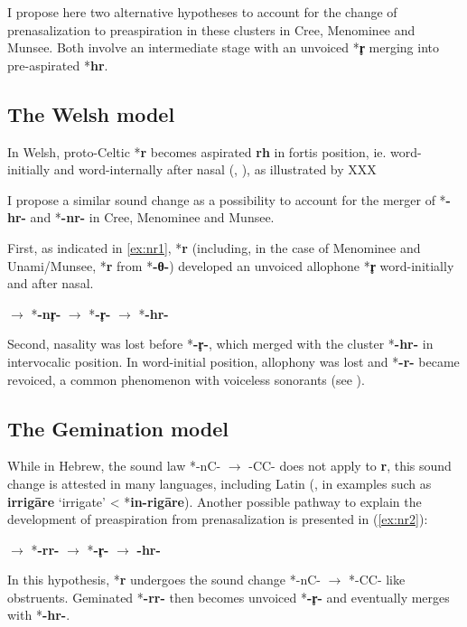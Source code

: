 \documentclass[oneside,a4paper,11pt]{article}
\newcommand{\ipa}[1]{{\phon\mbox{\textbf{#1}}}}
\begin{document}
I propose here two alternative hypotheses to account for the change of prenasalization to preaspiration in these clusters in Cree, Menominee and Munsee. Both involve an intermediate stage with an unvoiced *\ipa{r̥} merging into pre-aspirated *\ipa{hr}.

\subsection{The Welsh model}
In Welsh, proto-Celtic *\ipa{r} becomes aspirated \ipa{rh} in fortis position, ie. word-initially  and word-internally after nasal (\citealt[145]{kuemmel07wandel}, \citealt[471-480]{jackson56early}), as illustrated by XXX

I propose a similar sound change as a possibility to account for the merger of *\ipa{-hr-} and *\ipa{-nr-} in Cree, Menominee and Munsee.

First, as indicated in \ref{ex:nr1}, *\ipa{r} (including, in the case of Menominee and Unami/Munsee, *\ipa{r} from *\ipa{-θ-}) developed an unvoiced allophone *\ipa{r̥} word-initially and after nasal.

\begin{exe}
\ex \label{ex:nr1}
\glt *\ipa{-nr-} $\rightarrow$ *\ipa{-nr̥-} $\rightarrow$ *\ipa{-r̥-} $\rightarrow$ *\ipa{-hr-} 
\end{exe}

Second, nasality was lost before *\ipa{-r̥-}, which merged with the cluster *\ipa{-hr-} in intervocalic position. In word-initial position, allophony was lost and *\ipa{-r-} became revoiced, a common phenomenon with voiceless sonorants (see \citealt{blevins16voiceless.sonorants}).

\subsection{The Gemination model}
While in Hebrew, the sound law *-nC- $\rightarrow$ -CC- does not apply to \ipa{r}, this sound change is attested in many languages, including Latin (\citet[213]{leumann77lateinische}, in examples such as \ipa{irrigāre} `irrigate' < *\ipa{in-rigāre}). Another possible pathway to explain the development of preaspiration from prenasalization is presented in (\ref{ex:nr2}):

\begin{exe}
\ex \label{ex:nr2}
\glt *\ipa{-nr-} $\rightarrow$ *\ipa{-rr-} $\rightarrow$ *\ipa{-r̥-} $\rightarrow$ \ipa{-hr-} 
\end{exe}

In this hypothesis, *\ipa{r} undergoes the sound change *-nC- $\rightarrow$ *-CC- like obstruents. Geminated *\ipa{-rr-} then becomes unvoiced *\ipa{-r̥-} and eventually merges with *\ipa{-hr-}.



\end{document}
